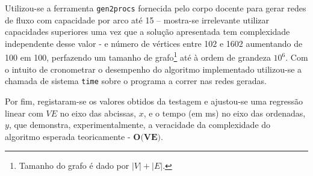 \documentclass[12pt]{article}
\begin{document}
Utilizou-se a ferramenta \texttt{gen2procs} fornecida pelo corpo docente para gerar redes de fluxo com capacidade por arco até 15 – mostra-se irrelevante utilizar capacidades superiores uma vez que a solução apresentada tem complexidade independente desse valor - e número de vértices entre 102 e 1602 aumentando de 100 em 100, perfazendo um tamanho de grafo\footnote{Tamanho do grafo é dado por \href{https://bit.ly/3gfDEJJ}{$\left|V\right|+\left|E\right|$}.} até à ordem de grandeza $10^6$. Com o intuito de cronometrar o desempenho do algoritmo implementado utilizou-se a chamada de sistema \texttt{time} sobre o programa a correr nas redes geradas.
\begin{center}
\end{center}

Por fim, registaram-se os valores obtidos da testagem e ajustou-se uma regressão linear com $VE$ no eixo das abcissas, $x$, e o tempo (em ms) no eixo das ordenadas, $y$, que demonstra, experimentalmente, a veracidade da complexidade do algoritmo esperada teoricamente - $\textbf{O(VE)}$.
\end{document}
